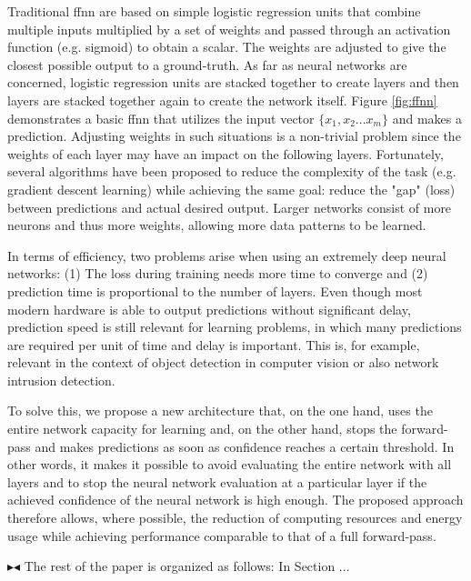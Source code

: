 \documentclass[conference]{IEEEtran}
\newcommand{\mynote}[3]{
    \fbox{\bfseries\sffamily\scriptsize#1}
    {\small$\blacktriangleright$\textsf{\emph{\color{#3}{#2}}}$\blacktriangleleft$}}
\newcommand{\todo}[1]{\mynote{TODO}{#1}{red}}
\begin{document}
Traditional \gls{ffnn} are based on simple logistic regression units that combine multiple inputs multiplied by a set of weights and passed through an activation function (e.g. sigmoid) to obtain a scalar. The weights are adjusted to give the closest possible output to a ground-truth. As far as neural networks are concerned, logistic regression units are stacked together to create layers and then layers are stacked together again to create the network itself. Figure \ref{fig:ffnn} demonstrates a basic \gls{ffnn} that utilizes the input vector $\lbrace x_{1}, x_{2} ... x_{m} \rbrace$ and makes a prediction. Adjusting weights in such situations is a non-trivial problem since the weights of each layer may have an impact on the following layers. Fortunately, several algorithms have been proposed to reduce the complexity of the task (e.g. gradient descent learning) while achieving the same goal: reduce the "gap" (loss) between predictions and actual desired output. Larger networks consist of more neurons and thus more weights, allowing more data patterns to be learned.

In terms of efficiency, two problems arise when using an extremely deep neural networks: (1) The loss during training needs more time to converge and (2) prediction time is proportional to the number of layers. Even though most modern hardware is able to output predictions without significant delay, prediction speed is still relevant for learning problems, in which many predictions are required per unit of time and delay is important. This is, for example, relevant in the context of object detection in computer vision or also network intrusion detection. 

To solve this, we propose a new architecture that, on the one hand, uses the entire network capacity for learning and, on the other hand, stops the forward-pass and makes predictions as soon as confidence reaches a certain threshold. In other words, it makes it possible to avoid evaluating the entire network with all layers and to stop the neural network evaluation at a particular layer if the achieved confidence of the neural network is high enough. The proposed approach therefore allows, where possible, the reduction of computing resources and energy usage while achieving performance comparable to that of a full forward-pass.


\todo{Max: For such a short paper it might not be necessary to give an overview?}
The rest of the paper is organized as follows: In Section ...
\end{document}
